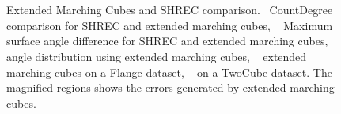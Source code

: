 \begin{figure}
	\centering
	\\
	\\
	\caption{Extended Marching Cubes and SHREC comparison.~\protect{} CountDegree comparison for SHREC and extended marching cubes, 
		~\protect{} Maximum surface angle difference for SHREC and extended marching cubes, 
		~\protect{} angle distribution  using extended marching cubes, 
		~\protect{} extended marching cubes on a Flange dataset, ~\protect{} on a TwoCube dataset. The magnified regions shows the errors generated by extended marching cubes.}	
\end{figure}


